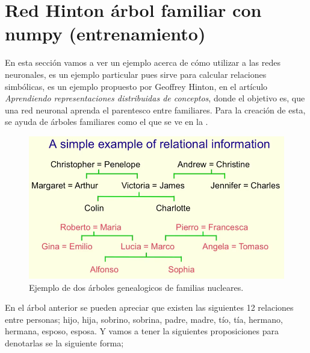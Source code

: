 \section{Red Hinton árbol familiar con numpy (entrenamiento)}

En esta sección vamos a ver un ejemplo acerca de cómo utilizar a las redes neuronales, es un ejemplo particular pues sirve para calcular relaciones simbólicas, es un ejemplo propuesto por Geoffrey Hinton, en el artículo \emph{Aprendiendo representaciones distribuidas de conceptos}, donde el objetivo es, que una red neuronal aprenda el parentesco entre familiares. Para la creación de esta, se ayuda de árboles familiares como el que se ve en la .
  
  \begin{figure}[h]
   \centering
   \includegraphics[scale=.5]{../Figuras/Hinton/ArbolGenealogico.png}
   \caption{Ejemplo de dos árboles genealogicos de familias nucleares.}
  \label{fig:arbolG}
  \end{figure}

En el árbol anterior se pueden apreciar que existen las siguientes 12 relaciones entre personas; hijo, hija, sobrino, sobrina, padre, madre, tío, tía, hermano, hermana, esposo, esposa. Y vamos a tener la siguientes proposiciones para denotarlas se la siguiente forma; 

